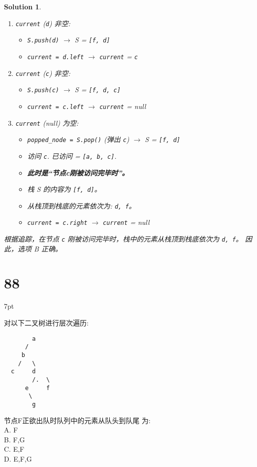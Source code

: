 \documentclass[UTF8]{report}
\newtheorem{solution}{Solution}
\theoremstyle{MyLineTheoremStyle} %
\theoremstyle{MyBlockTheoremStyle} %
\theoremstyle{MySubsubsectionStyle} %
\newenvironment{graybox}{%
        \def\FrameCommand{%
        \hspace{1pt}%
        {\color{gray}\small \vrule width 2pt}%
        {\color{graybox_color}\vrule width 4pt}%
        \colorbox{graybox_color}%
        }%
        \MakeFramed{\advance\hsize-\width\FrameRestore}%
        \noindent\hspace{-4.55pt}%
        \begin{adjustwidth}{}{7pt}%
        \vspace{2pt}\vspace{2pt}%
        }
        {%
        \vspace{2pt}\end{adjustwidth}\endMakeFramed%
        }
\begin{document}
\begin{solution}
\begin{enumerate}
\begin{itemize}
        \end{itemize}
    \item \texttt{current} (\texttt{d}) 非空:
        \begin{itemize}
            \item \texttt{S.push(d)} $\rightarrow$ S = \texttt{[f, d]}
            \item \texttt{current = d.left} $\rightarrow$ \texttt{current} = \texttt{c}
        \end{itemize}
    \item \texttt{current} (\texttt{c}) 非空:
        \begin{itemize}
            \item \texttt{S.push(c)} $\rightarrow$ S = \texttt{[f, d, c]}
            \item \texttt{current = c.left} $\rightarrow$ \texttt{current} = null
        \end{itemize}
    \item \texttt{current} (null) 为空:
        \begin{itemize}
            \item \texttt{popped\_node = S.pop()} (弹出 \texttt{c}) $\rightarrow$ S = \texttt{[f, d]}
            \item 访问 \texttt{c}. 已访问 = \texttt{[a, b, c]}.
            \item \textbf{此时是“节点c刚被访问完毕时”。}
            \item 栈 S 的内容为 \texttt{[f, d]}。
            \item 从栈顶到栈底的元素依次为: \texttt{d, f}。
            \item \texttt{current = c.right} $\rightarrow$ \texttt{current} = null
        \end{itemize}
\end{enumerate}
根据追踪，在节点 \texttt{c} 刚被访问完毕时，栈中的元素从栈顶到栈底依次为 \texttt{d, f}。
因此，选项 B 正确。
\end{solution}



\section*{88}
\begin{graybox}
对以下二叉树进行层次遍历:
\begin{lstlisting}
        a
      /
     b
    /   \
  c     d
        /.  \
      e     f
       \
        g
\end{lstlisting}
节点F正欲出队时队列中的元素从队头到队尾
为: \\
A. F \\
B. F,G \\
C. E,F \\
D. E,F,G
\end{graybox}
\end{document}
